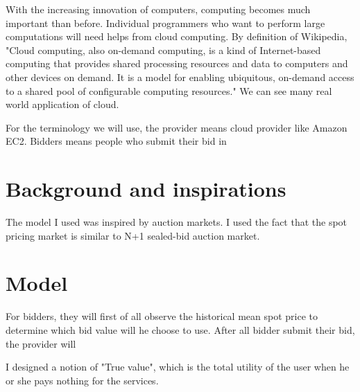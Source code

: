 \documentclass[11pt]{article}
\begin{document}
With the increasing innovation of computers, computing becomes much important than before. Individual programmers who want to perform large computations will need helps from cloud computing. By definition of Wikipedia, "Cloud computing, also on-demand computing, is a kind of Internet-based computing that provides shared processing resources and data to computers and other devices on demand. It is a model for enabling ubiquitous, on-demand access to a shared pool of configurable computing resources." We can see many real world application of cloud.

For the terminology we will use, the provider means cloud provider like Amazon EC2. Bidders means people who submit their bid in 

\section{Background and inspirations}

The model I used was inspired by auction markets. I used the fact that the spot pricing market is similar to N+1 sealed-bid auction market.

\section{Model}

For bidders, they will first of all observe the historical mean spot price to determine which bid value will he choose to use. After all bidder submit their bid, the provider will 


I designed a notion of "True value", which is the total utility of the user when he or she pays nothing for the services.




\end{document}
